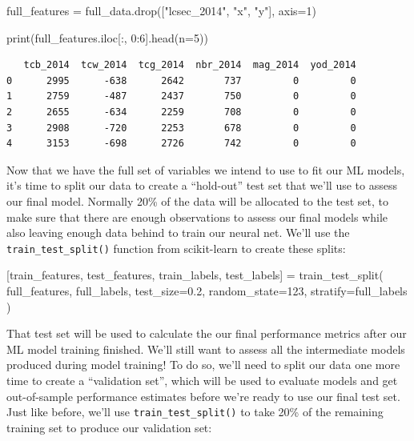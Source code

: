 \documentclass[
  letterpaper,
  DIV=11,
  numbers=noendperiod]{scrartcl}
\newenvironment{Shaded}{\begin{snugshade}}{\end{snugshade}}
\newcommand{\BuiltInTok}[1]{\textcolor[rgb]{0.00,0.23,0.31}{#1}}
\newcommand{\DecValTok}[1]{\textcolor[rgb]{0.68,0.00,0.00}{#1}}
\newcommand{\FloatTok}[1]{\textcolor[rgb]{0.68,0.00,0.00}{#1}}
\newcommand{\NormalTok}[1]{\textcolor[rgb]{0.00,0.23,0.31}{#1}}
\newcommand{\OperatorTok}[1]{\textcolor[rgb]{0.37,0.37,0.37}{#1}}
\newcommand{\StringTok}[1]{\textcolor[rgb]{0.13,0.47,0.30}{#1}}
\begin{document}
\begin{Shaded}
\begin{Highlighting}[]
\NormalTok{full\_features }\OperatorTok{=}\NormalTok{ full\_data.drop([}\StringTok{"lcsec\_2014"}\NormalTok{, }\StringTok{"x"}\NormalTok{, }\StringTok{"y"}\NormalTok{], axis}\OperatorTok{=}\DecValTok{1}\NormalTok{)}

\BuiltInTok{print}\NormalTok{(full\_features.iloc[:, }\DecValTok{0}\NormalTok{:}\DecValTok{6}\NormalTok{].head(n}\OperatorTok{=}\DecValTok{5}\NormalTok{))}
\end{Highlighting}
\end{Shaded}

\begin{verbatim}
   tcb_2014  tcw_2014  tcg_2014  nbr_2014  mag_2014  yod_2014
0      2995      -638      2642       737         0         0
1      2759      -487      2437       750         0         0
2      2655      -634      2259       708         0         0
3      2908      -720      2253       678         0         0
4      3153      -698      2726       742         0         0
\end{verbatim}

Now that we have the full set of variables we intend to use to fit our
ML models, it's time to split our data to create a ``hold-out'' test set
that we'll use to assess our final model. Normally 20\% of the data will
be allocated to the test set, to make sure that there are enough
observations to assess our final models while also leaving enough data
behind to train our neural net. We'll use the
\texttt{train\_test\_split()} function from scikit-learn to create these
splits:

\begin{Shaded}
\begin{Highlighting}[]
\NormalTok{[train\_features, test\_features, train\_labels, test\_labels] }\OperatorTok{=}\NormalTok{ train\_test\_split(}
\NormalTok{    full\_features, full\_labels, test\_size}\OperatorTok{=}\FloatTok{0.2}\NormalTok{, random\_state}\OperatorTok{=}\DecValTok{123}\NormalTok{, stratify}\OperatorTok{=}\NormalTok{full\_labels}
\NormalTok{)}
\end{Highlighting}
\end{Shaded}

That test set will be used to calculate the our final performance
metrics after our ML model training finished. We'll still want to assess
all the intermediate models produced during model training! To do so,
we'll need to split our data one more time to create a ``validation
set'', which will be used to evaluate models and get out-of-sample
performance estimates before we're ready to use our final test set. Just
like before, we'll use \texttt{train\_test\_split()} to take 20\% of the
remaining training set to produce our validation set:
\end{document}
